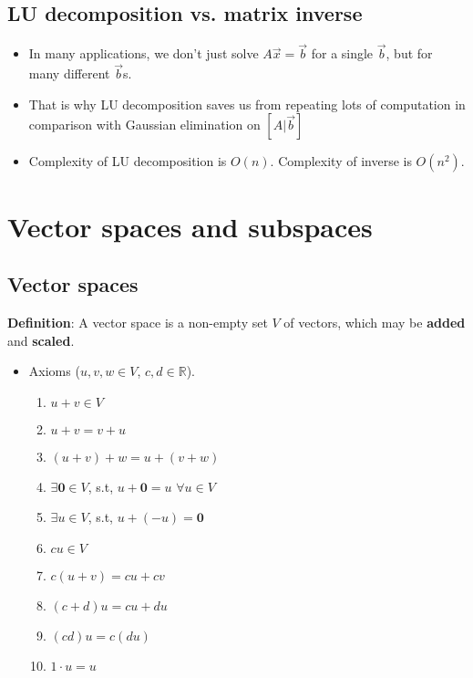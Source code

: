 \documentclass{article}
\begin{document}
\subsection{LU decomposition vs. matrix inverse}
{
\begin{itemize}
    \item In many applications, we don't just solve $A\vec{x}=\vec{b}$ for a single $\vec{b}$, but for many different $\vec{b}$s.
    \item That is why LU decomposition saves us from repeating lots of computation in comparison with Gaussian elimination on $[ A | \vec{b} ]$
    \item Complexity of LU decomposition is $O(n)$. Complexity of inverse is $O(n^2)$.
\end{itemize}
}

\section{Vector spaces and subspaces}

\subsection{Vector spaces}
{

\textbf{Definition}: 
A vector space is a non-empty set $V$ of vectors, which may be \textbf{added} and \textbf{scaled}.

\begin{itemize}
    \item Axioms ($u,v,w \in V$,  $c,d \in \mathbb{R}$).
    \begin{enumerate}
        \item $u+v \in V$
        \item $u+v = v + u$
        \item $(u+v)+w = u+(v+w)$
        \item $\exists\mathbf{0} \in V $, s.t, $u+\mathbf{0}=u$ $\forall u \in V$
        \item $\exists u \in V$, s.t, $u+(-u)=\mathbf{0}$
        \item $cu \in V$
        \item $c(u+v) = cu + cv$
        \item $(c+d)u = cu + du$
        \item $(cd)u = c(du)$
        \item $1\cdot u = u$
    \end{enumerate}
\end{itemize}

}
\end{document}
